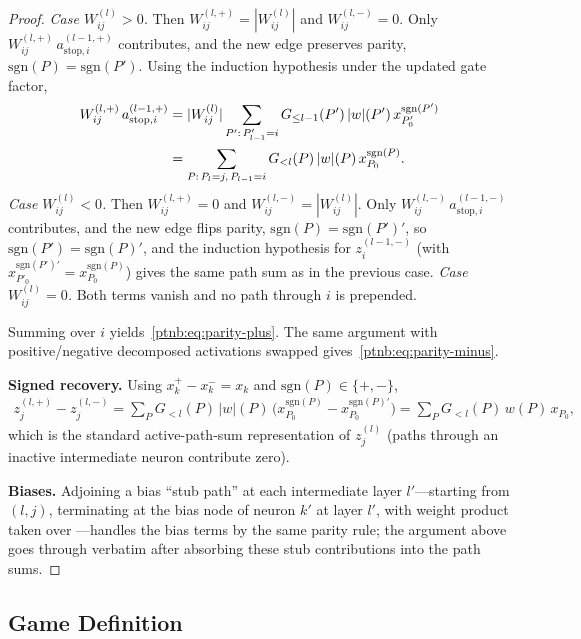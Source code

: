 \begin{proof}
\emph{Case $W^{(l)}_{ij} > 0$.} Then $W_{ij}^{(l,+)} = |W^{(l)}_{ij}|$ and $W_{ij}^{(l,-)} = 0$.
Only $W_{ij}^{(l,+)}\, a_{\mathrm{stop},i}^{(l-1,+)}$ contributes, and the new edge preserves
parity, $\mathrm{sgn}(P) = \mathrm{sgn}(P')$. Using the induction hypothesis under the updated gate
factor,
\begin{align}
    W_{ij}^{(l,+)}\, a_{\mathrm{stop},i}^{(l-1,+)}
    &= |W^{(l)}_{ij}| \sum_{P':\, P'_{l-1} = i} G_{\le l-1}(P')\, |w|(P')\, x_{P'_0}^{\mathrm{sgn}(P')}
    \notag\\
    &= \sum_{P:\, P_l = j,\, P_{l-1} = i} G_{<l}(P)\, |w|(P)\, x_{P_0}^{\mathrm{sgn}(P)}.
\end{align}
\emph{Case $W^{(l)}_{ij} < 0$.} Then $W_{ij}^{(l,+)} = 0$ and $W_{ij}^{(l,-)} = |W^{(l)}_{ij}|$.
Only $W_{ij}^{(l,-)}\, a_{\mathrm{stop},i}^{(l-1,-)}$ contributes, and the new edge flips parity,
$\mathrm{sgn}(P) = \mathrm{sgn}(P')'$, so $\mathrm{sgn}(P') = \mathrm{sgn}(P)'$, and the induction
hypothesis for $z_i^{(l-1,-)}$ (with $x_{P'_0}^{\mathrm{sgn}(P')'} = x_{P_0}^{\mathrm{sgn}(P)}$)
gives the same path sum as in the previous case.
\emph{Case $W^{(l)}_{ij} = 0$.} Both terms vanish and no path through $i$ is prepended.

Summing over $i$ yields~\eqref{ptnb:eq:parity-plus}. The same argument with positive/negative decomposed
activations swapped gives~\eqref{ptnb:eq:parity-minus}.

\textbf{Signed recovery.} Using $x_k^+ - x_k^- = x_k$ and $\mathrm{sgn}(P) \in \{+,-\}$,
\begin{align}
    z_j^{(l,+)} - z_j^{(l,-)}
    = \sum_P G_{<l}(P)\, |w|(P)\, \bigl(x_{P_0}^{\mathrm{sgn}(P)} - x_{P_0}^{\mathrm{sgn}(P)'}\bigr)
    = \sum_P G_{<l}(P)\, w(P)\, x_{P_0},
\end{align}
which is the standard active-path-sum representation of $z_j^{(l)}$ (paths through an inactive
intermediate neuron contribute zero).

\textbf{Biases.} Adjoining a bias ``stub path'' at each intermediate layer $l'$---starting from
$(l,j)$, terminating at the bias node of neuron $k'$ at layer $l'$, with weight product taken over ---handles the
bias terms by the same parity rule; the argument above goes through verbatim
after absorbing these stub contributions into the path sums.
\end{proof}

\subsection{Game Definition}\label{ptnb:app:adf-game-def}\label{sec:shapley_bellman_recursion}\label{ptnb:app:adf-recursion}

